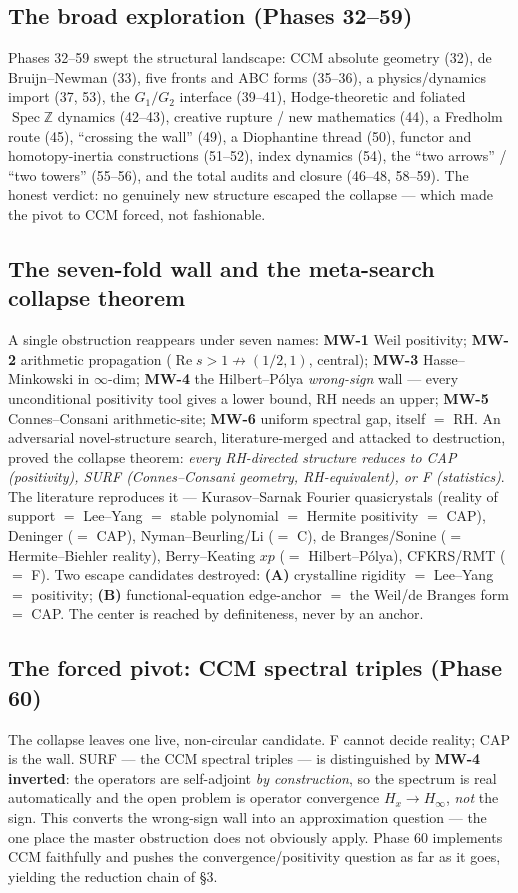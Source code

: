 \documentclass[11pt]{amsart}
\theoremstyle{definition}
\theoremstyle{remark}
\begin{document}
\subsection{The broad exploration (Phases 32--59)}
Phases 32--59 swept the structural landscape: CCM absolute geometry (32), de Bruijn--Newman
(33), five fronts and ABC forms (35--36), a physics/dynamics import (37, 53), the $G_1/G_2$
interface (39--41), Hodge-theoretic and foliated $\operatorname{Spec}\mathbb Z$ dynamics
(42--43), creative rupture / new mathematics (44), a Fredholm route (45), ``crossing the wall''
(49), a Diophantine thread (50), functor and homotopy-inertia constructions (51--52), index
dynamics (54), the ``two arrows'' / ``two towers'' (55--56), and the total audits and closure
(46--48, 58--59). The honest verdict: no genuinely new structure escaped the collapse --- which
made the pivot to CCM forced, not fashionable.

\subsection{The seven-fold wall and the meta-search collapse theorem}
A single obstruction reappears under seven names: \textbf{MW-1} Weil positivity; \textbf{MW-2}
arithmetic propagation ($\operatorname{Re}s>1\not\to(1/2,1)$, central); \textbf{MW-3}
Hasse--Minkowski in $\infty$-dim; \textbf{MW-4} the Hilbert--P\'olya \emph{wrong-sign} wall ---
every unconditional positivity tool gives a lower bound, RH needs an upper; \textbf{MW-5}
Connes--Consani arithmetic-site; \textbf{MW-6} uniform spectral gap, itself $=$ RH. An
adversarial novel-structure search, literature-merged and attacked to destruction, proved the
collapse theorem: \emph{every RH-directed structure reduces to CAP (positivity), SURF
(Connes--Consani geometry, RH-equivalent), or F (statistics)}. The literature reproduces it ---
Kurasov--Sarnak Fourier quasicrystals (reality of support $=$ Lee--Yang $=$ stable polynomial
$=$ Hermite positivity $=$ CAP), Deninger ($=$ CAP), Nyman--Beurling/Li ($=$ C), de
Branges/Sonine ($=$ Hermite--Biehler reality), Berry--Keating $xp$ ($=$ Hilbert--P\'olya),
CFKRS/RMT ($=$ F). Two escape candidates destroyed: \textbf{(A)} crystalline rigidity $=$
Lee--Yang $=$ positivity; \textbf{(B)} functional-equation edge-anchor $=$ the Weil/de Branges
form $=$ CAP. The center is reached by definiteness, never by an anchor.

\subsection{The forced pivot: CCM spectral triples (Phase 60)}
The collapse leaves one live, non-circular candidate. F cannot decide reality; CAP is the wall.
SURF --- the CCM spectral triples --- is distinguished by \textbf{MW-4 inverted}: the operators
are self-adjoint \emph{by construction}, so the spectrum is real automatically and the open
problem is operator convergence $H_x\to H_\infty$, \emph{not} the sign. This converts the
wrong-sign wall into an approximation question --- the one place the master obstruction does not
obviously apply. Phase 60 implements CCM faithfully and pushes the convergence/positivity
question as far as it goes, yielding the reduction chain of \S3.
\end{document}
